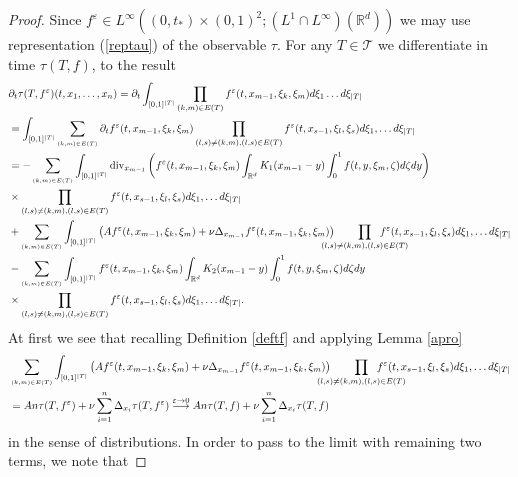 \documentclass[10pt]{article}
\def\divv{\operatorname {div}}
\newcommand{\ve}{\varepsilon}
\newcommand{\R}{\mathbb{R}}
\newcommand{\izj}{\int_{0}^{1}}
\newcommand{\ird}{\int_{\mathbb{R}^d}}
\newcommand{\Tree}{\mathcal{T}}
\begin{document}
\begin{proof}
Since $f^\ve \in L^{\infty}((0,t_{*})\times (0,1)^2;(L^1\cap L^{\infty})(\R^d))$ we may use representation (\ref{reptau}) of the observable $\tau$. 
For any $T \in \Tree $ we differentiate in time $\tau(T,f)$, to the result
\begin{align*}
   &\partial_t \tau(T,f^\ve)(t,x_1,\dots,x_n) = \partial_t \int_{[0,1]^{|T|}} \prod_{(k,m)\in E(T)} f^\ve(t,x_{m-1},\xi_k,\xi_m)d\xi_1\dots d\xi_{|T|} \\
   & = \int_{[0,1]^{|T|}}\sum_{_{(k,m)\in E(T)}} \partial_t f^\ve(t,x_{m-1},\xi_k,\xi_{m})\prod _{(l,s)\neq (k,m), (l,s) \in E(T)} f^\ve(t,x_{s-1},\xi_l,\xi_{s}) d\xi_1,\dots d \xi_{|T|}\\
   & =  -\sum_{_{(k,m)\in E(T)}}\int_{[0,1]^{|T|}}\divv_{x_{m-1}} \left( f^\ve(t,x_{m-1},\xi_k,\xi_{m}) \ird K_{1}(x_{m-1}-y)\izj f(t,y,\xi_{m},\zeta) d\zeta dy\right)\\
   &\times\prod _{(l,s)\neq (k,m), (l,s) \in E(T)} f^\ve(t,x_{s-1},\xi_l,\xi_{s}) d\xi_1,\dots d \xi_{|T|} \\
   &+ \sum_{_{(k,m)\in E(T)}}\int_{[0,1]^{|T|}}\left(A f^\ve(t,x_{m-1},\xi_k,\xi_{m})+\nu \Delta_{x_{m-1}} f^\ve(t,x_{m-1},\xi_k,\xi_{m}) \right)\hspace{-0.5cm}\prod_{(l,s)\neq (k,m), (l,s) \in E(T)} \hspace{-1cm}f^\ve(t,x_{s-1},\xi_l,\xi_{s}) d\xi_1,\dots d \xi_{|T|} \\
   &-\sum_{_{(k,m)\in E(T)}}\int_{[0,1]^{|T|}} f^\ve(t,x_{m-1},\xi_k,\xi_{m}) \ird K_{2}(x_{m-1}-y)\izj f(t,y,\xi_{m},\zeta) d\zeta dy\\
   &\times \prod _{(l,s)\neq (k,m), (l,s) \in E(T)} f^\ve(t,x_{s-1},\xi_l,\xi_{s}) d\xi_1,\dots d \xi_{|T|}.
\end{align*}
At first we see that recalling Definition \ref{deftf} and applying Lemma \ref{apro}
\begin{align*}
&\sum_{_{(k,m)\in E(T)}}\int_{[0,1]^{|T|}}\left(A f^\ve(t,x_{m-1},\xi_k,\xi_{m})+\nu \Delta_{x_{m-1}} f^\ve(t,x_{m-1},\xi_k,\xi_{m}) \right)\hspace{-0.5cm}\prod_{(l,s)\neq (k,m), (l,s) \in E(T)} \hspace{-1cm}f^\ve(t,x_{s-1},\xi_l,\xi_{s}) d\xi_1,\dots d \xi_{|T|}\\
&= An\tau(T,f^\ve) + \nu \sum_{i=1}^n\Delta_{x_i} \tau(T,f^\ve)\overset{\ve\rightarrow 0}{\longrightarrow} An\tau(T,f) + \nu \sum_{i=1}^n\Delta_{x_i} \tau(T,f)
\end{align*}
in the sense of distributions.
In order to pass to the limit with remaining two terms, we note that

\end{proof}
\end{document}
